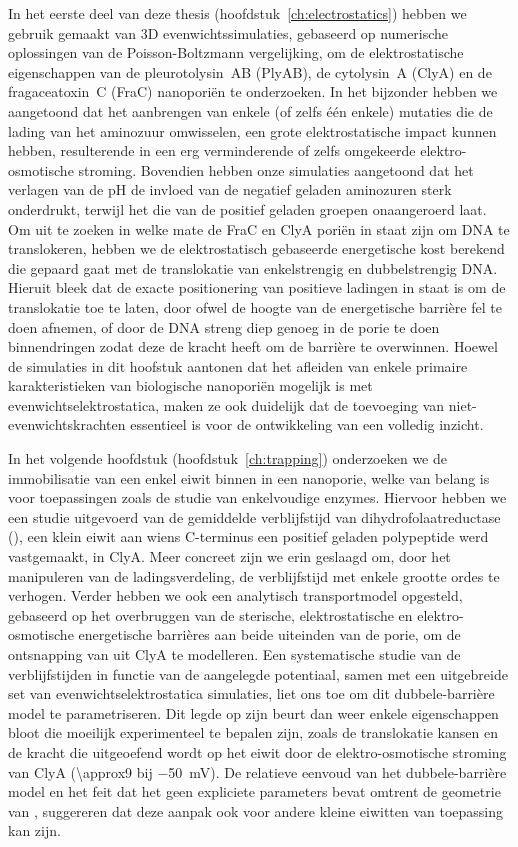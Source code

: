 In het eerste deel van deze thesis (hoofdstuk~\ref{ch:electrostatics}) hebben we gebruik gemaakt van 3D
evenwichtssimulaties, gebaseerd op numerische oplossingen van de Poisson-Boltzmann vergelijking, om de
elektrostatische eigenschappen van de pleurotolysin~AB (PlyAB), de cytolysin~A (ClyA) en de fragaceatoxin~C
(FraC) nanopori\"{e}n te onderzoeken. In het bijzonder hebben we aangetoond dat het aanbrengen van enkele (of
zelfs \'{e}\'{e}n enkele) mutaties die de lading van het aminozuur omwisselen, een grote elektrostatische
impact kunnen hebben, resulterende in een erg verminderende of zelfs omgekeerde elektro-osmotische stroming.
Bovendien hebben onze simulaties aangetoond dat het verlagen van de pH de invloed van de negatief geladen
aminozuren sterk onderdrukt, terwijl het die van de positief geladen groepen onaangeroerd laat. Om uit te
zoeken in welke mate de FraC en ClyA pori\"{e}n in staat zijn om DNA te translokeren, hebben we de
elektrostatisch gebaseerde energetische kost berekend die gepaard gaat met de translokatie van enkelstrengig
en dubbelstrengig DNA. Hieruit bleek dat de exacte positionering van positieve ladingen in staat is om de
translokatie toe te laten, door ofwel de hoogte van de energetische barri\`{e}re fel te doen afnemen, of door
de DNA streng diep genoeg in de porie te doen binnendringen zodat deze de kracht heeft om de barri\`{e}re te
overwinnen. Hoewel de simulaties in dit hoofstuk aantonen dat het afleiden van enkele primaire
karakteristieken van biologische nanopori\"{e}n mogelijk is met evenwichtselektrostatica, maken ze ook
duidelijk dat de toevoeging van niet-evenwichtskrachten essentieel is voor de ontwikkeling van een volledig
inzicht.

In het volgende hoofdstuk (hoofdstuk~\ref{ch:trapping}) onderzoeken we de immobilisatie van een enkel eiwit
binnen in een nanoporie, welke van belang is voor toepassingen zoals de studie van enkelvoudige enzymes.
Hiervoor hebben we een studie uitgevoerd van de gemiddelde verblijfstijd van dihydrofolaatreductase
(\DHFRt{}), een klein eiwit aan wiens C-terminus een positief geladen polypeptide werd vastgemaakt, in ClyA.
Meer concreet zijn we erin geslaagd om, door het manipuleren van de ladingsverdeling, de verblijfstijd met
enkele grootte ordes te verhogen. Verder hebben we ook een analytisch transportmodel opgesteld, gebaseerd op
het overbruggen van de sterische, elektrostatische en elektro-osmotische energetische barri\`{e}res aan beide
uiteinden van de porie, om de ontsnapping van \DHFRt{} uit ClyA te modelleren. Een systematische studie van de
verblijfstijden in functie van de aangelegde potentiaal, samen met een uitgebreide set van
evenwichtselektrostatica simulaties, liet ons toe om dit dubbele-barri\`{e}re model te parametriseren. Dit
legde op zijn beurt dan weer enkele eigenschappen bloot die moeilijk experimenteel te bepalen zijn, zoals de
translokatie kansen en de kracht die uitgeoefend wordt op het eiwit door de elektro-osmotische stroming van
ClyA (\SI{\approx9}{\pN} bij \SI{-50}{\mV}). De relatieve eenvoud van het dubbele-barri\`{e}re model en het
feit dat het geen expliciete parameters bevat omtrent de geometrie van \DHFRt{}, suggereren dat deze aanpak
ook voor andere kleine eiwitten van toepassing kan zijn.

